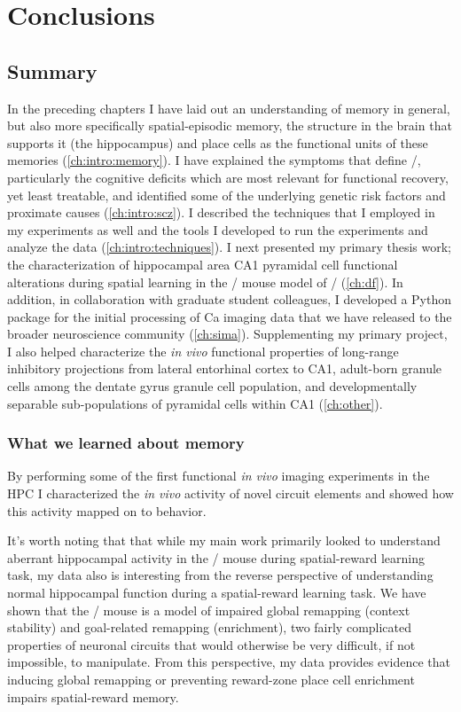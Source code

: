 \acresetall
\chapter{Conclusions}
\label{ch:conclusions}

\section{Summary}
In the preceding chapters I have laid out an understanding of memory in general, but also more specifically spatial-episodic memory, the structure in the brain that supports it (the hippocampus) and place cells as the functional units of these memories (\autoref{ch:intro:memory}).
I have explained the symptoms that define \scz/, particularly the cognitive deficits which are most relevant for functional recovery, yet least treatable, and identified some of the underlying genetic risk factors and proximate causes (\autoref{ch:intro:scz}).
I described the techniques that I employed in my experiments as well and the tools I developed to run the experiments and analyze the data (\autoref{ch:intro:techniques}).
I next presented my primary thesis work; the characterization of hippocampal area CA1 pyramidal cell functional alterations during spatial learning in the \df/ mouse model of \scz/ (\autoref{ch:df}).
In addition, in collaboration with graduate student colleagues, I developed a Python package for the initial processing of Ca imaging data that we have released to the broader neuroscience community (\autoref{ch:sima}).
Supplementing my primary project, I also helped characterize the \emph{in vivo} functional properties of long-range inhibitory projections from lateral entorhinal cortex to CA1, adult-born granule cells among the dentate gyrus granule cell population, and developmentally separable sub-populations of pyramidal cells within CA1 (\autoref{ch:other}).


\subsection{What we learned about memory}

By performing some of the first functional \emph{in vivo} imaging experiments in the \ac{HPC} I characterized the \emph{in vivo} activity of novel circuit elements and showed how this activity mapped on to behavior.

It's worth noting that that while my main work primarily looked to understand aberrant hippocampal activity in the \df/ mouse during spatial-reward learning task, my data also is interesting from the reverse perspective of understanding normal hippocampal function during a spatial-reward learning task.
We have shown that the \df/ mouse is a model of impaired global remapping (context stability) and goal-related remapping (enrichment), two fairly complicated properties of neuronal circuits that would otherwise be very difficult, if not impossible, to manipulate.
From this perspective, my data provides evidence that inducing global remapping or preventing reward-zone place cell enrichment impairs spatial-reward memory.

